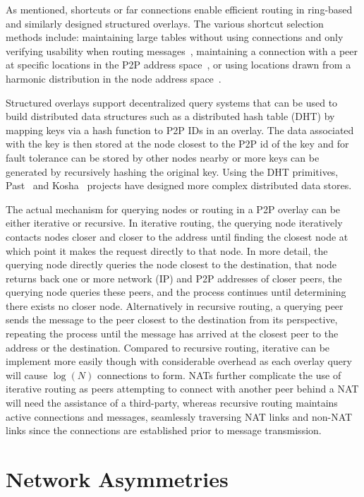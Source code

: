 As mentioned, shortcuts or far connections enable efficient routing in
ring-based and similarly designed structured overlays.  The various shortcut
selection methods include: maintaining large tables without using connections
and only verifying usability when routing messages~\cite{pastry, kademlia},
maintaining a connection with a peer at specific locations in the P2P address
space~\cite{chord}, or using locations drawn from a harmonic distribution in
the node address space~\cite{symphony}.

Structured overlays support decentralized query systems that can be used to
build distributed data structures such as a distributed hash table (DHT) by
mapping keys via a hash function to P2P IDs in an overlay.  The data associated
with the key is then stored at the node closest to the P2P id of the key and
for fault tolerance can be stored by other nodes nearby or more keys can be
generated by recursively hashing the original key.  Using the DHT primitives,
Past~\cite{past} and Kosha~\cite{kosha} projects have designed more complex
distributed data stores.

The actual mechanism for querying nodes or routing in a P2P overlay can be
either iterative or recursive.  In iterative routing, the querying node
iteratively contacts nodes closer and closer to the address until finding the
closest node at which point it makes the request directly to that node.  In
more detail, the querying node directly queries the node closest to the
destination, that node returns back one or more network (IP) and P2P addresses
of closer peers, the querying node queries these peers, and the process
continues until determining there exists no closer node.  Alternatively in
recursive routing, a querying peer sends the message to the peer closest to
the destination from its perspective, repeating the process until the message
has arrived at the closest peer to the address or the destination.  Compared
to recursive routing, iterative can be implement more easily though with
considerable overhead as each overlay query will cause $\log(N)$ connections
to form.  NATs further complicate the use of iterative routing as peers
attempting to connect with another peer behind a NAT will need the assistance
of a third-party, whereas recursive routing maintains active connections and
messages, seamlessly traversing NAT links and non-NAT links since the
connections are established prior to message transmission.

\section{Network Asymmetries}

